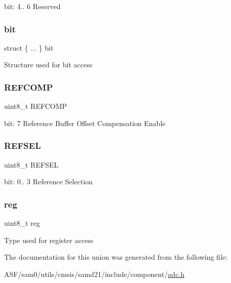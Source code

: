 bit\+: 4.. 6 Reserved \mbox{\label{union_a_d_c___r_e_f_c_t_r_l___type_a7c6c5b84734b683cc24fc03b56729c66}} 
\subsubsection{\texorpdfstring{bit}{bit}}
{\footnotesize\ttfamily struct \{ ... \}   bit}

Structure used for bit access \mbox{\label{union_a_d_c___r_e_f_c_t_r_l___type_afe9dd195158ff7a303b3b3b536f0dbe0}} 
\subsubsection{\texorpdfstring{REFCOMP}{REFCOMP}}
{\footnotesize\ttfamily uint8\+\_\+t R\+E\+F\+C\+O\+MP}

bit\+: 7 Reference Buffer Offset Compensation Enable \mbox{\label{union_a_d_c___r_e_f_c_t_r_l___type_a31386ac97a08a22e5f39b0481794d58a}} 
\subsubsection{\texorpdfstring{REFSEL}{REFSEL}}
{\footnotesize\ttfamily uint8\+\_\+t R\+E\+F\+S\+EL}

bit\+: 0.. 3 Reference Selection \mbox{\label{union_a_d_c___r_e_f_c_t_r_l___type_a9428adc9af4653a2050e2536b55dec8d}} 
\subsubsection{\texorpdfstring{reg}{reg}}
{\footnotesize\ttfamily uint8\+\_\+t reg}

Type used for register access 

The documentation for this union was generated from the following file\+:\begin{DoxyCompactItemize}
\item 
A\+S\+F/sam0/utils/cmsis/samd21/include/component/\mbox{\hyperlink{component_2adc_8h}{adc.\+h}}\end{DoxyCompactItemize}
